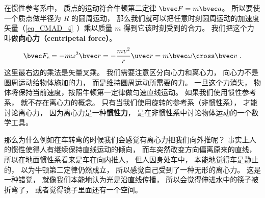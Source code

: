 

在惯性参考系中， 质点的运动符合牛顿第二定律 $\bvec F = m\bvec a$。 所以要使一个质点做半径为 $R$ 的圆周运动， 那么我们就可以把任意时刻圆周运动的加速度矢量（\autoref{eq_CMAD_4}~）乘以质量 $m$ 得到它该时刻受到的合力。 我们把这个力叫做\textbf{向心力（centripetal force）}。
\begin{equation}
\bvec F_c = -m \omega^2 \bvec r = -\frac{mv^2}{r}\uvec r = m\bvec \omega \cross \bvec v~.
\end{equation}
这里最右边的乘法是矢量叉乘。 我们需要注意区分向心力和离心力， 向心力不是圆周运动给物体施加的力， 而是维持圆周运动所需要的力。 一旦这个力消失， 物体将保持当前速度，按照牛顿第一定律做匀速直线运动。 如果我们使用惯性参考系， 就不存在离心力的概念。 只有当我们使用旋转的参考系（非惯性系）， 才能讨论离心力， 因为离心力是一种\textbf{惯性力}， 是在非惯性系中讨论物体运动的一个数学工具。

那么为什么例如在车转弯的时候我们会感觉有离心力把我们向外推呢？ 事实上人的惯性使得人有继续保持直线运动的倾向， 而车突然改变方向偏离原来的直线， 所以在地面惯性系看来是车在向内推人， 但人因身处车中， 本能地觉得车是静止的， 以为牛顿第二定律仍然成立， 所以感觉自己受到了一种无形的离心力。 这是一种错觉， 就像我们本能地认为光是沿直线传播， 所以会觉得伸进水中的筷子被折弯了， 或者觉得镜子里面还有一个空间。
